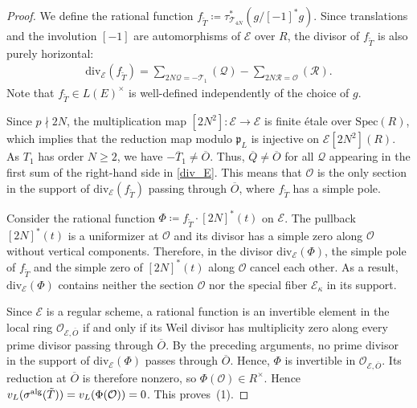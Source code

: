 \documentclass[11pt]{amsart}
\theoremstyle{definition}
\begin{document}
\begin{proof}
We define the rational function $f_{\tilde{T}} \coloneqq \tau_{\mathcal{T}_{4N}}^{*}(g/[-1]^{*}g)$. Since translations and the involution $[-1]$ are automorphisms of $\mathcal{E}$ over $R$, the divisor of $f_{\tilde{T}}$ is also purely horizontal:
%
\begin{align}\label{div_E}
\mathrm{div}_{\mathcal{E}}(f_{\tilde{T}}) = \sum_{2N\mathcal{Q}=-\mathcal{T}_{1}} (\mathcal{Q}) - \sum_{2N\mathcal{R}=\mathcal{O}} (\mathcal{R}).
\end{align}
%
Note that $f_{\tilde{T}} \in L(E)^{\times}$ is well-defined independently of the choice of $g$.

Since $p \nmid 2N$, the multiplication map $[2N^2]: \mathcal{E} \to \mathcal{E}$ is finite \'{e}tale over $\mathrm{Spec}(R)$, which implies that the reduction map modulo $\mathfrak{p}_L$ is injective on $\mathcal{E}[2N^2](R)$. As $T_1$ has order $N \ge 2$, we have $-\overline{T}_1 \neq \overline{O}$. Thus, $\overline{Q} \neq \overline{O}$ for all $\mathcal{Q}$ appearing in the first sum of the right-hand side in \eqref{div_E}. This means that $\mathcal{O}$ is the only section in the support of $\mathrm{div}_{\mathcal{E}}(f_{\tilde{T}})$ passing through $\overline{O}$, where $f_{\tilde{T}}$ has a simple pole.

Consider the rational function $\Phi \coloneqq f_{\tilde{T}} \cdot [2N]^{*}(t)$ on $\mathcal{E}$. The pullback $[2N]^{*}(t)$ is a uniformizer at $\mathcal{O}$ and its divisor has a simple zero along $\mathcal{O}$ without vertical components. Therefore, in the divisor $\mathrm{div}_{\mathcal{E}}(\Phi)$, the simple pole of $f_{\tilde{T}}$ and the simple zero of $[2N]^{*}(t)$ along $\mathcal{O}$ cancel each other. As a result, $\mathrm{div}_{\mathcal{E}}(\Phi)$ contains neither the section $\mathcal{O}$ nor the special fiber $\mathcal{E}_\kappa$ in its support.

Since $\mathcal{E}$ is a regular scheme, a rational function is an invertible element in the local ring $\mathcal{O}_{\mathcal{E}, \overline{O}}$ if and only if its Weil divisor has multiplicity zero along every prime divisor passing through $\overline{O}$. By the preceding arguments, no prime divisor in the support of $\mathrm{div}_{\mathcal{E}}(\Phi)$ passes through $\overline{O}$. Hence, $\Phi$ is invertible in $\mathcal{O}_{\mathcal{E}, \overline{O}}$. Its reduction at $\overline{O}$ is therefore nonzero, so $\Phi(\mathcal{O}) \in R^\times$. Hence $v_L(\sigma^{\rm alg}(\tilde{T}))=v_L(\Phi(\mathcal{O}))=0$. This proves~(1).



\end{proof}
\end{document}
